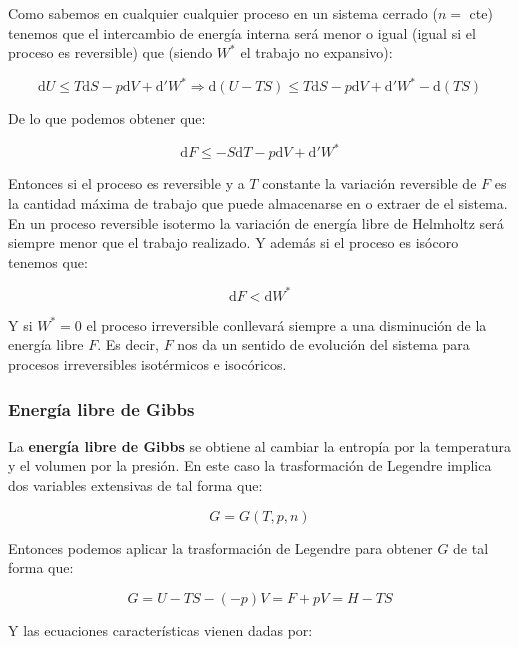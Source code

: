 \documentclass[12pt,a4paper]{article}
\newcommand{\D}{\mathrm{d}}
\begin{document}
Como sabemos en cualquier cualquier proceso en un sistema cerrado ($n=$ cte) tenemos que el intercambio de energía interna será menor o igual (igual si el proceso es reversible) que (siendo $W^*$ el trabajo no expansivo):

$$ \D U \leq T \D S - p \D V + \D ' W^*  \Longrightarrow \D(U-TS) \leq T \D S - p \D V + \D ' W^*  - \D(TS) $$ 

De lo que podemos obtener que:

\begin{equation}
\D F \leq  - S \D T - p \D V + \D ' W^*
\end{equation}

Entonces si el proceso es reversible y a $T$ constante la variación reversible de $F$ es la cantidad máxima de trabajo que puede almacenarse en o extraer de el sistema. En un proceso reversible isotermo la variación de energía libre de Helmholtz será siempre menor que el trabajo realizado. Y además si el proceso es isócoro tenemos que:

$$ \D F < \D W^* $$

Y si $W^*=0$ el proceso irreversible conllevará siempre a una disminución de la energía libre $F$. Es decir, $F$ nos da un sentido de evolución del sistema para procesos irreversibles isotérmicos e isocóricos. 

\subsubsection{Energía libre de Gibbs}

La \textbf{energía libre de Gibbs} se obtiene al cambiar la entropía por la temperatura y el volumen por la presión. En este caso la trasformación de Legendre implica dos variables extensivas de tal forma que:

\begin{equation}
G = G(T,p,n)
\end{equation}

Entonces podemos aplicar la trasformación de Legendre para obtener $G$ de tal forma que:

\begin{equation}
G = U - TS - (-p)V = F + pV = H - TS
\end{equation}

Y las ecuaciones características vienen dadas por:
\end{document}
